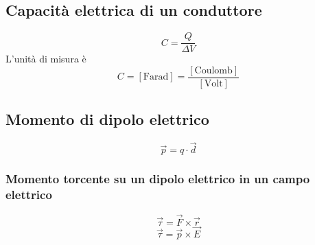 \documentclass[twoside]{article}
\begin{document}
\subsection{Capacità elettrica di un conduttore}
\begin{equation}
    \boxed{C = \displaystyle \frac{Q}{\Delta V}}
\end{equation}
L'unità di misura è
\begin{equation*}
    C = \left[\text{Farad}\right] = \frac{\left[\text{Coulomb}\right]}{\left[\text{Volt}\right]}
\end{equation*}
\subsection{Momento di dipolo elettrico}
\begin{equation}
    \boxed{\vec{p} = q \cdot \vec{d}}
\end{equation}
\subsubsection{Momento torcente su un dipolo elettrico in un campo elettrico}
\begin{equation}
    \boxed{\vec{\tau} = \vec{F} \times \vec{r}}
\end{equation}
\begin{equation}
    \boxed{\vec{\tau} = \vec{p} \times \vec{E}}
\end{equation}
\end{document}
